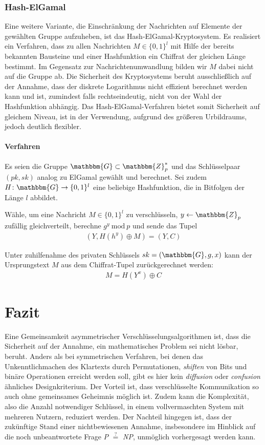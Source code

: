 \subsubsection{Hash-ElGamal}
Eine weitere Variante, die Einschränkung der Nachrichten auf Elemente der gewählten Gruppe aufzuheben, ist das Hash-ElGamal-Kryptosystem. Es realisiert ein Verfahren, dass zu allen Nachrichten $M \in \{0, 1\}^l$ mit Hilfe der bereits bekannten Bausteine und einer Hashfunktion ein Chiffrat der gleichen Länge bestimmt. Im Gegensatz zur Nachrichtenumwandlung bilden wir $M$ dabei nicht auf die Gruppe ab. Die Sicherheit des Kryptosystems beruht ausschließlich auf der Annahme, dass der diskrete Logarithmus nicht effizient berechnet werden kann und ist, zumindest falls rechtseindeutig, nicht von der Wahl der Hashfunktion abhängig. Das Hash-ElGamal-Verfahren bietet somit Sicherheit auf gleichem Niveau, ist in der Verwendung, aufgrund des größeren Urbildraums, jedoch deutlich flexibler.

\paragraph*{Verfahren}
Es seien die Gruppe $\mathbbm{G} \subset \mathbbm{Z}^*_p$ und das Schlüsselpaar $(pk,sk)$ analog zu ElGamal gewählt und berechnet. Sei zudem $H \colon \mathbbm{G} \rightarrow \{0,1\}^l$ eine beliebige Hashfunktion, die in Bitfolgen der Länge $l$ abbildet.

Wähle, um eine Nachricht $M \in \{0,1\}^l$ zu verschlüsseln, $y \leftarrow \mathbbm{Z}_p$ zufällig gleichverteilt, berechne $g^y\ \text{mod}\ p$ und sende das Tupel
\begin{align*}
(Y, H(h^y) \oplus M) = (Y, C)
\end{align*}

Unter zuhilfenahme des privaten Schlüssels $sk = (\mathbbm{G}, g, x)$ kann der Ursprungstext $M$ aus dem Chiffrat-Tupel zurückgerechnet werden:
\begin{align*}
M = H(Y^x) \oplus C
\end{align*}

\section{Fazit}
Eine Gemeinsamkeit asymmetrischer Verschlüsselungsalgorithmen ist, dass die Sicherheit auf der Annahme, ein mathematisches Problem sei nicht  lösbar, beruht. Anders als bei symmetrischen Verfahren, bei denen das Unkenntlichmachen des Klartexts durch Permutationen, \textit{shiften} von Bits und binäre Operationen erreicht werden soll, gibt es hier kein \textit{diffusion} oder \textit{confusion} ähnliches Designkriterium. Der Vorteil ist, dass verschlüsselte Kommunikation so auch ohne gemeinsames Geheimnis möglich ist. Zudem kann die Komplexität, also die Anzahl notwendiger Schlüssel, in einem vollvermaschten System mit mehreren Nutzern, reduziert werden. Der Nachteil hingegen ist, dass der zukünftige Stand einer nichtbewiesenen Annahme, insbesondere im Hinblick auf die noch unbeantwortete Frage \textit{P} $\stackrel{?}{=}$ \textit{NP}, unmöglich vorhergesagt werden kann.

